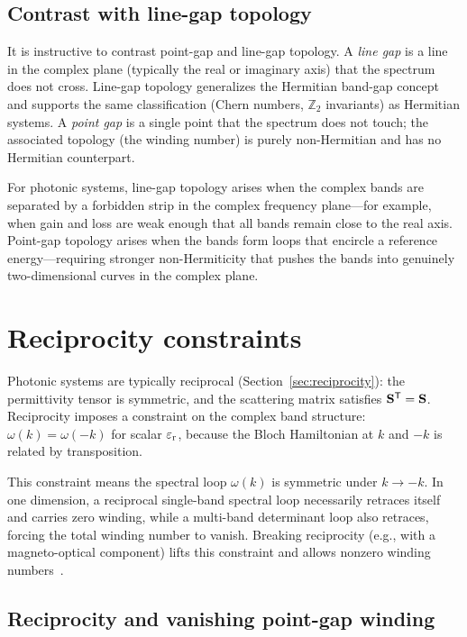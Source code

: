 \subsection{Contrast with line-gap topology}
\label{ssec:line-vs-point}

It is instructive to contrast point-gap and line-gap topology. A
\emph{line gap} is a line in the complex plane (typically the real or
imaginary axis) that the spectrum does not cross. Line-gap topology
generalizes the Hermitian band-gap concept and supports the same
classification (Chern numbers, $\mathbb{Z}_2$ invariants) as Hermitian
systems. A \emph{point gap} is a single point that the spectrum does
not touch; the associated topology (the winding number) is purely
non-Hermitian and has no Hermitian counterpart.

For photonic systems, line-gap topology arises when the complex bands
are separated by a forbidden strip in the complex frequency plane---for
example, when gain and loss are weak enough that all bands remain close
to the real axis. Point-gap topology arises when the bands form loops
that encircle a reference energy---requiring stronger non-Hermiticity
that pushes the bands into genuinely two-dimensional curves in the
complex plane.


\section{Reciprocity constraints}
\label{sec:reciprocity-constraints}

Photonic systems are typically reciprocal (Section~\ref{sec:reciprocity}):
the permittivity tensor is symmetric, and the scattering matrix
satisfies $\mathbf{S}^{\mathsf{T}} = \mathbf{S}$. Reciprocity imposes a constraint
on the complex band structure: $\omega(k) = \omega(-k)$ for scalar
$\varepsilon_{\mathrm{r}}$, because the Bloch Hamiltonian at $k$ and $-k$ is related by
transposition.

This constraint means the spectral loop $\omega(k)$ is symmetric under
$k \to -k$.  In one dimension, a reciprocal single-band spectral loop
necessarily retraces itself and carries zero winding, while a
multi-band determinant loop also retraces, forcing the total winding
number to vanish.  Breaking
reciprocity (e.g., with a magneto-optical component) lifts this
constraint and allows nonzero winding numbers~\cite{longhi2019probing,zhang2021observation,lin2023topological}.

\subsection{Reciprocity and vanishing point-gap winding}
\label{ssec:even-winding}

